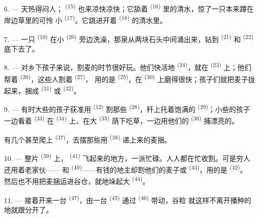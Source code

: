 6. --- 天热得闷人； \textsuperscript{(15)} 也来凉快凉快；它舔着
 \textsuperscript{(16)} 里的清水，惊了一只本来蹲在岸边草里的可怜
小 \textsuperscript{(17)}。它跳进开着 \textsuperscript{(18)}
的清水里。

7. --- 一只 \textsuperscript{(19)} 在小 \textsuperscript{(20)}
旁边洗澡，那泉从两块石头中间涌出来，钻到 \textsuperscript{(21)}
和 \textsuperscript{(22)} 底下去了。

\VUsaut{5.0mm}
\VUsaut{3.4mm}

8. --- 对乡下孩子来说，割麦的时节很好玩。他们快活地
\textsuperscript{(24)}，就在 \textsuperscript{(23)} 上；他们帮着
 \textsuperscript{(26)}，这些人割着 \textsuperscript{(27)}，
用的是 \textsuperscript{(25)}，在 \textsuperscript{(30)}
上磨得很快；孩子们就把麦子拢起来，捆成 \textsuperscript{(31)} 或
\textsuperscript{(32)}。

9. --- 有时大些的孩子获准用 \textsuperscript{(12)} 割那些
 \textsuperscript{(28)}，秆上托着饱满的
\textsuperscript{(29)}；小些的孩子一边看着 \textsuperscript{(33)}
在 \textsuperscript{(34)} 上、在大 \textsuperscript{(35)}
荫下吃草，一边用他们的 \textsuperscript{(36)} 捕漂亮的。

有几个甚至爬上 \textsuperscript{(37)}，去摆那些用
\textsuperscript{(38)} 递上来的麦捆。

10. --- 整片 \textsuperscript{(39)} 上， \textsuperscript{(41)}
飞起来的地方，一派忙碌。人人都在忙收割。可是穷人还用着老家伙——
和 \textsuperscript{(40)}——有钱的地主却割他们的麦子或
 \textsuperscript{(43)}，用的是 \textsuperscript{(42)}。
然后也不用把麦捆运进谷仓，就地垛起大 \textsuperscript{(44)}。

11. --- 接着开来一台 \textsuperscript{(47)}，由一台
 \textsuperscript{(45)} 通过 \textsuperscript{(46)} 带动，谷粒
就这样不离开播种的地就跟分开了。

\VUsaut{5.0mm}
\VUsaut{3.4mm}

